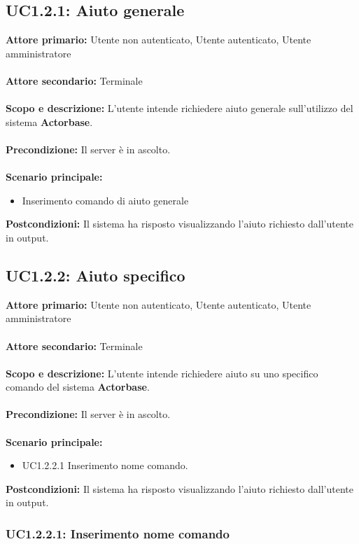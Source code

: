 \documentclass{scalatekids-article}
\begin{document}
\subsection{UC1.2.1: Aiuto generale}

\textbf{Attore primario:} Utente non autenticato, Utente autenticato, Utente amministratore\\ \\
\textbf{Attore secondario:} Terminale\\ \\
\textbf{Scopo e descrizione:} L'utente intende richiedere aiuto generale sull'utilizzo del sistema \textbf{Actorbase}.\\ \\
\textbf{Precondizione:} Il server è in ascolto.\\ \\
\textbf{Scenario principale:}
\begin{itemize}
  \item Inserimento comando di aiuto generale %
\end{itemize}
\textbf{Postcondizioni:} Il sistema ha risposto visualizzando l'aiuto richiesto dall'utente in output.

\subsection{UC1.2.2: Aiuto specifico}

\textbf{Attore primario:} Utente non autenticato, Utente autenticato, Utente amministratore\\ \\
\textbf{Attore secondario:} Terminale\\ \\
\textbf{Scopo e descrizione:} L'utente intende richiedere aiuto su uno specifico comando del sistema \textbf{Actorbase}.\\ \\
\textbf{Precondizione:} Il server è in ascolto.\\ \\
\textbf{Scenario principale:}
\begin{itemize}
  \item UC1.2.2.1 Inserimento nome comando.
\end{itemize}
\textbf{Postcondizioni:} Il sistema ha risposto visualizzando l'aiuto richiesto dall'utente in output.

\subsubsection{UC1.2.2.1: Inserimento nome comando}
\end{document}
